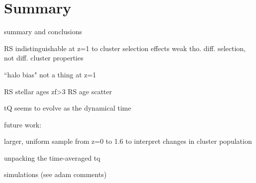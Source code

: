 \chapter{Summary}

summary and conclusions

RS indistinguishable at z=1 to cluster selection effects
weak tho. diff. selection, not diff. cluster properties

``halo bias" not a thing at z=1

RS stellar ages zf>3
RS age scatter

tQ seems to evolve as the dynamical time

future work:

larger, uniform sample from z=0 to 1.6 to interpret
changes in cluster population

unpacking the time-averaged tq

simulations (see adam comments)
